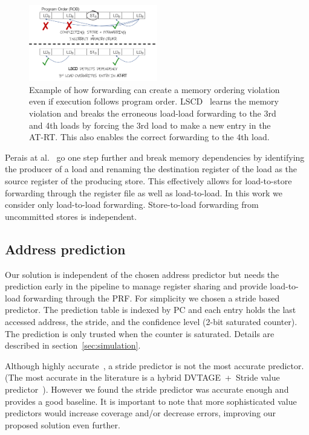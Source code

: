 \documentclass{sig-alternate}
\begin{document}
\begin{figure}[ht]
\centerline{\includegraphics[width=0.50\textwidth]{diagrams/LSCD.pdf}}
\caption{Example of how forwarding can create a memory ordering violation even if execution follows program order. LSCD~\cite{DLVP/sheikh17} learns the memory violation and breaks the erroneous load-load forwarding to the 3rd and 4th loads by forcing the 3rd load to make a new entry in the AT-RT. This also enables the correct forwarding to the 4th load.}
\label{fig:LSCD}
\end{figure}


Perais at al.~\cite{ISRB/perais16} go one step further and break memory dependencies by identifying the producer of a load and renaming the destination register of the load as the source register of the producing store. This effectively allows for load-to-store forwarding through the register file as well as load-to-load. In this work we consider only load-to-load forwarding. Store-to-load forwarding from uncommitted stores is independent.


\subsection{Address prediction}
Our solution is independent of the chosen address predictor but needs the prediction early in the pipeline to manage register sharing and provide load-to-load forwarding through the PRF. For simplicity we chosen a stride based predictor. The prediction table is indexed by PC and each entry holds the last accessed address, the stride, and the confidence level (2-bit saturated counter). The prediction is only trusted when the counter is saturated. Details are described in section~\ref{sec:simulation}. 

Although highly accurate~\cite{AVPP/orosa18}, a stride predictor is not the most accurate predictor. (The most accurate in the literature is a hybrid DVTAGE~+~Stride value predictor~\cite{AVPP/orosa18}). However we found the stride predictor was accurate enough and provides a good baseline. It is important to note that more  sophisticated value predictors would increase coverage and/or decrease errors, improving our proposed solution even further.  
\end{document}
